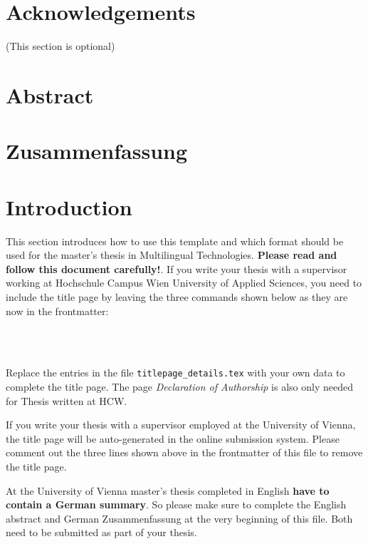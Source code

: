 \documentclass[a4paper,fontsize=12pt,listof=totoc,bibliography=totoc]{scrbook}
\begin{document}

 

\chapter*{Acknowledgements}
(This section is optional)

\chapter*{Abstract}
\chapter*{Zusammenfassung}

	
\thispagestyle{empty}
\tableofcontents{}
\listoftables 
\listoffigures



\mainmatter{}

\chapter{Introduction}
This section introduces how to use this template and which format should be used for the master's thesis in Multilingual Technologies. \textbf{Please read and follow this document carefully!}. If you write your thesis with a supervisor working at Hochschule Campus Wien University of Applied Sciences, you need to include the title page by leaving the three commands shown below as they are now in the frontmatter: 

\begin{verbatim}

 
\end{verbatim}

Replace the entries in the file \verb|titlepage_details.tex| with your own data to complete the title page. The page \textit{Declaration of Authorship} is also only needed for Thesis written at HCW.

If you write your thesis with a supervisor employed at the University of Vienna, the title page will be auto-generated in the online submission system. Please comment out the three lines shown above in the frontmatter of this file to remove the title page. 

At the University of Vienna master's thesis completed in English \textbf{have to contain a German summary}. So please make sure to complete the English abstract and German Zusammenfassung at the very beginning of this file. Both need to be submitted as part of your thesis. 
\end{document}
